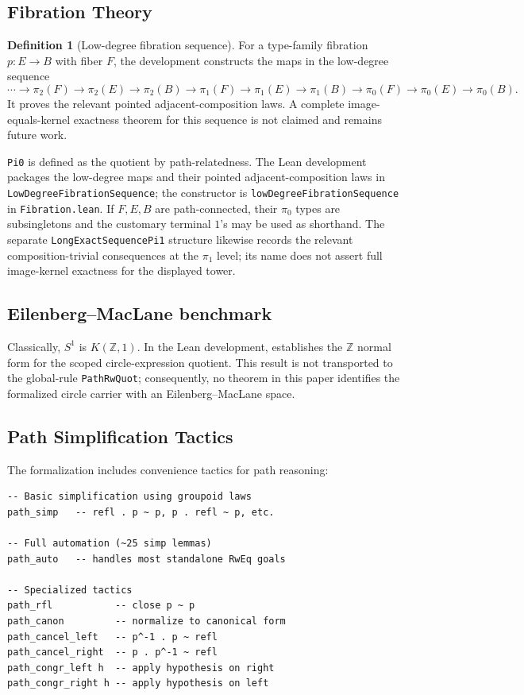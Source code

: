 \documentclass{lmcs}
\theoremstyle{definition}
\newtheorem{definition}{Definition}[section]
\theoremstyle{plain}
\theoremstyle{remark}
\newcommand{\piOne}{\pi_1}
\newcommand{\piTwo}{\pi_2}
\newcommand{\ZZ}{\mathbb{Z}}
\begin{document}
\subsection{Fibration Theory}

\begin{definition}[Low-degree fibration sequence]
For a type-family fibration $p : E \to B$ with fiber $F$, the development
constructs the maps in the low-degree sequence
\[
\cdots \to \piTwo(F) \to \piTwo(E) \to \piTwo(B)
\to \piOne(F) \to \piOne(E) \to \piOne(B)
\to \pi_0(F) \to \pi_0(E) \to \pi_0(B).
\]
It proves the relevant pointed adjacent-composition laws. A complete
image-equals-kernel exactness theorem for this sequence is not claimed and
remains future work.
\end{definition}

\texttt{Pi0} is defined as the quotient by path-relatedness. The Lean
development packages the low-degree maps and their pointed
adjacent-composition laws in
\texttt{LowDegreeFibrationSequence}; the constructor is
\texttt{lowDegreeFibrationSequence} in \texttt{Fibration.lean}.  If \(F,E,B\)
are path-connected, their \(\pi_0\) types are subsingletons and the customary
terminal \(1\)'s may be used as shorthand. The separate
\texttt{LongExactSequencePi1} structure likewise records the relevant
composition-trivial consequences at the \(\pi_1\) level; its name does not
assert full image-kernel exactness for the displayed tower.

\subsection{Eilenberg--MacLane benchmark}

Classically, \(S^1\) is \(K(\ZZ,1)\).  In the Lean development,
 establishes the \(\ZZ\) normal form for the
scoped circle-expression quotient.  This result is not transported to the
global-rule \texttt{PathRwQuot}; consequently, no theorem in this paper
identifies the formalized circle carrier with an Eilenberg--MacLane space.

\subsection{Path Simplification Tactics}

The formalization includes convenience tactics for path reasoning:

\begin{lstlisting}
-- Basic simplification using groupoid laws
path_simp   -- refl . p ~ p, p . refl ~ p, etc.

-- Full automation (~25 simp lemmas)
path_auto   -- handles most standalone RwEq goals

-- Specialized tactics
path_rfl           -- close p ~ p
path_canon         -- normalize to canonical form
path_cancel_left   -- p^-1 . p ~ refl
path_cancel_right  -- p . p^-1 ~ refl
path_congr_left h  -- apply hypothesis on right
path_congr_right h -- apply hypothesis on left
\end{lstlisting}
\end{document}
